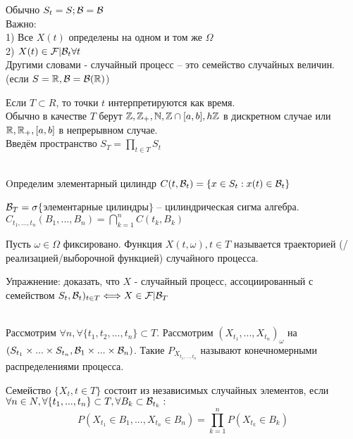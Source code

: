 Обычно $S_t = S; \mathcal{B} = \mathcal{B}$\\
Важно:\\
1) Все $X(t)$ определены на одном и том же $\Omega$\\
2) $X(t)\in\mathcal{F}|\mathcal{B}_t \forall t$\\
Другими словами - случайный процесс -- это семейство случайных величин. (если $S = \mathbb{R}, \mathcal{B} = \mathcal{B}(\mathbb{R})$)

Если $T \subset R$, то точки $t$ интерпретируются как время.\\
Обычно в качестве $T$ берут $\mathbb{Z}, \mathbb{Z}_+, \mathbb{N}, \mathbb{Z}\cap[a,b], h\mathbb{Z}$ в дискретном случае или $\mathbb{R}, \mathbb{R}_+, [a,b]$ в непрерывном случае.\\
Введём пространство $S_T = \prod\limits_{t\in T}S_t$\\\\


\begin{opr}
Oпределим элементарный цилиндр $C(t, \mathcal{B}_t) = \{x\in S_t: x(t)\in \mathcal{B}_t\}$
\end{opr}
$\mathcal{B}_T = \sigma\{$элементарные цилиндры$\}$ -- цилиндрическая сигма алгебра.\\
$C_{t_1,...,t_n}(B_1,...,B_n) = \bigcap\limits_{k=1}^{n} C(t_k, B_k)$

\begin{opr}
Пусть $\omega\in \Omega$ фиксировано. Функция $X(t,\omega),t\in T$ называется траекторией (/реализацией/выборочной функцией) случайного процесса.
\end{opr}
Упражнение: доказать, что $X$ - случайный процесс, ассоциированный с семейством $S_t, \mathcal{B}_t)_{t\in T} \Longleftrightarrow X\in \mathcal{F}|\mathcal{B}_T$\\\\

\begin{opr}
Рассмотрим $\forall n, \forall \{t_1,t_2,...,t_n\}\subset T$. Рассмотрим $(X_{t_1}, ..., X_{t_n})_\omega$ на $(S_{t_1}\times ... \times S_{t_n}, \mathcal{B}_1\times ... \times \mathcal{B}_n)$. Такие $P_{X_{t_1,...,t_n}}$ называют конечномерными распределениями процесса.
\end{opr}

\begin{opr}
Семейство $\{X_t, t\in T\}$ состоит из независимых случайных элементов, если $\forall n\in N, \forall \{t_1,...,t_n\}\subset T, \forall B_k\subset \mathcal{B}_{t_k}:$
$$P(X_{t_1} \in B_1, ..., X_{t_n}\in B_n) = \prod\limits_{k=1}^n P(X_{t_k}\in B_k)$$
\end{opr}

